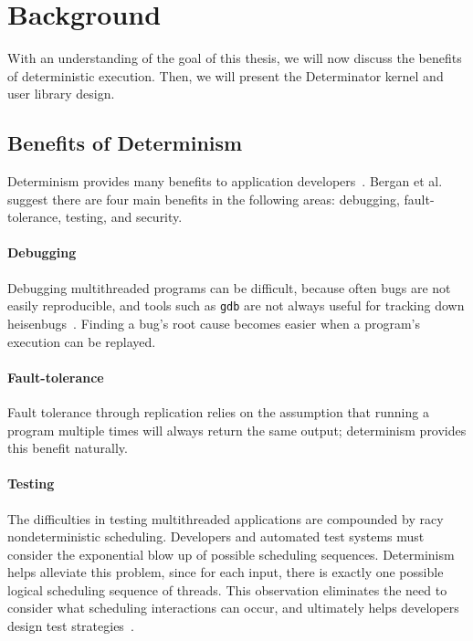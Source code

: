 
\section{Background}

With an understanding of the goal of this thesis, we will now discuss the
benefits of deterministic execution. Then, we will present the Determinator
kernel and user library design.

\subsection{Benefits of Determinism}

Determinism provides many benefits to application
developers~\cite{Bergan11,olszewski2009kendo,bocchino2009parallel}. Bergan et
al. suggest there are four main benefits in
the following areas: debugging, fault-tolerance, testing, and security.

\paragraph{Debugging} Debugging multithreaded programs can be difficult, because
often bugs are not easily reproducible, and tools such as {\tt gdb} are not
always useful for tracking down heisenbugs~\cite{Musuvathi08}. Finding a bug's
root cause becomes easier when a program's execution can be replayed.

\paragraph{Fault-tolerance} Fault tolerance through replication relies
on the assumption that running a program multiple times will always return the
same output; determinism provides this benefit naturally.

\paragraph{Testing} The difficulties in testing multithreaded applications are
compounded by racy nondeterministic scheduling. Developers and automated test
systems must consider the exponential blow up of possible scheduling sequences.
Determinism helps alleviate this problem, since for each input, there is exactly
one possible logical scheduling sequence of threads. This observation eliminates
the need to consider what scheduling interactions can occur, and ultimately
helps developers design test strategies~\cite{Bergan11}.

